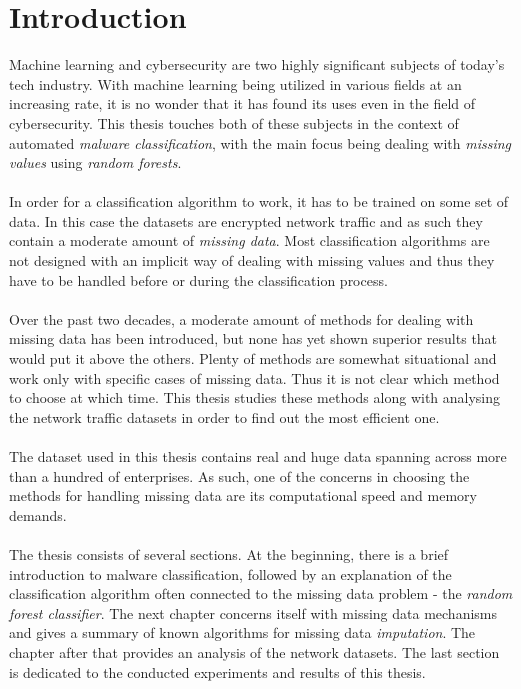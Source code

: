 \documentclass[11pt]{article}
\begin{document}
  \section*{Introduction}
    Machine learning and cybersecurity are two highly significant subjects of today's tech industry. With machine learning being utilized in various fields at an increasing rate, it is no wonder that it has found its uses even in the field of cybersecurity. This thesis touches both of these subjects in the context of automated {\it malware classification}, with the main focus being dealing with {\it missing values} using {\it random forests}.
    \\~\\
    In order for a classification algorithm to work, it has to be trained on some set of data. In this case the datasets are encrypted network traffic and as such they contain a moderate amount of {\it missing data}. Most classification algorithms are not designed with an implicit way of dealing with missing values and thus they have to be handled before or during the classification process.
    \\~\\
    Over the past two decades\cite{otfi}\cite{lwd}\cite{mia}, a moderate amount of methods for dealing with missing data has been introduced, but none has yet shown superior results that would put it above the others. Plenty of methods are somewhat situational and work only with specific cases of missing data. Thus it is not clear which method to choose at which time. This thesis studies these methods along with analysing the network traffic datasets in order to find out the most efficient one.
    \\~\\
    The dataset used in this thesis contains real and huge data spanning across more than a hundred of enterprises. As such, one of the concerns in choosing the methods for handling missing data are its computational speed and memory demands.
    \\~\\
    The thesis consists of several sections. At the beginning, there is a brief introduction to malware classification, followed by an explanation of the classification algorithm often connected to the missing data problem - the {\it random forest classifier}. The next chapter concerns itself with missing data mechanisms and gives a summary of known algorithms for missing data {\it imputation}. The chapter after that provides an analysis of the network datasets. The last section is dedicated to the conducted experiments and results of this thesis.
  \newpage
\end{document}
